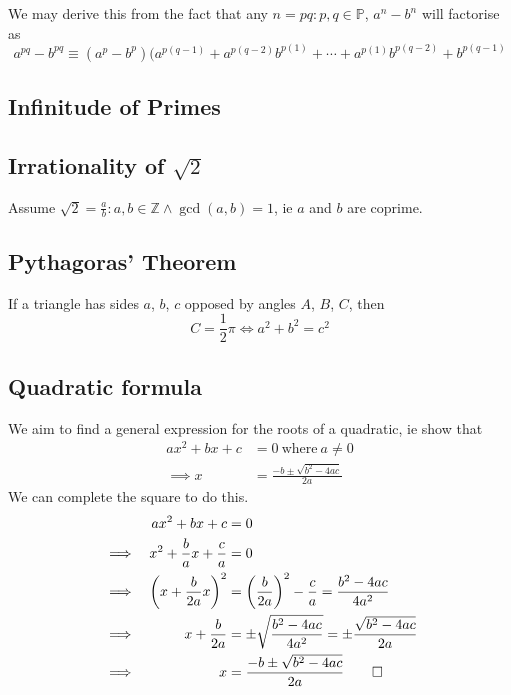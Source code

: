 \documentclass[fleqn,a4paper,11pt]{article}
\begin{document}
    We may derive this from the fact that any \(n = pq: p, q \in \mathbb P\),
    \(a^n - b^n\) will factorise as
    \begin{equation}
    a^{pq} - b^{pq} \equiv
     (a^p - b^p)(a^{p(q - 1)} + a^{p(q - 2)}b^{p(1)} + \dotsb +
                 a^{p(1)}b^{p(q - 2)} + b^{p(q - 1)}
    \end{equation}

    \subsection{Infinitude of Primes}

    \subsection[Irrationality of \(\sqrt 2\)]
               {Irrationality of \boldmath\(\sqrt 2\)}

    Assume \(\sqrt 2 = \frac ab : a, b \in \mathbb Z \land \gcd(a, b) = 1\), ie
    \(a\) and \(b\) are coprime.

    \subsection{Pythagoras' Theorem} \label{sec_pythagoras}


    If a triangle has sides \(a\), \(b\), \(c\) opposed by angles \(A\), \(B\),
    \(C\), then
    \begin{equation}
    C = \frac 12 \pi \iff a^2 + b^2 = c^2
    \end{equation}

    \subsection{Quadratic formula} \label{sec_quad_formula}

    We aim to find a general expression for the roots of a quadratic, ie show
    that
    \begin{equation}
    \begin{split}
    ax^2 + bx + c &= 0\ \text{where}\ a \neq 0 \\
    \implies x &= \frac{-b \pm \sqrt{b^2 - 4ac}}{2a}
    \end{split}
    \end{equation}
    We can complete the square to do this.
    \begin{alignat*}{2}
    &&ax^2 + bx + c &= 0 \\
    &\implies& x^2 + \frac{b}{a}x + \frac{c}{a} &= 0 \\
    &\implies& \pqty{x + \frac{b}{2a}x}^2 &= \pqty{\frac{b}{2a}}^2 - \frac{c}{a}
        = \frac{b^2 - 4ac}{4a^2} \\
    &\implies& x + \frac{b}{2a} &= \pm \sqrt{\frac{b^2 - 4ac}{4a^2}}
        = \pm \frac{\sqrt{b^2 - 4ac}}{2a} \\
    &\implies& x &= \frac{-b \pm \sqrt{b^2 - 4ac}}{2a} \qed
    \end{alignat*}
\end{document}
